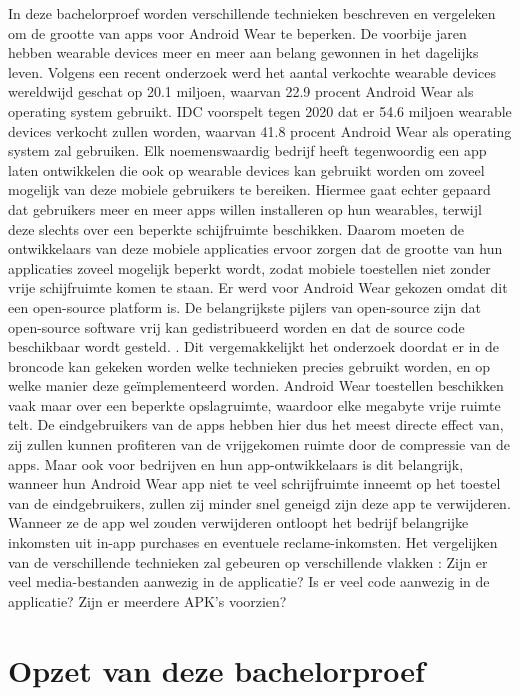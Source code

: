 In deze bachelorproef worden verschillende technieken beschreven en vergeleken om de grootte van apps voor Android Wear te beperken. De voorbije jaren hebben wearable devices meer en meer aan belang gewonnen in het dagelijks leven. Volgens een recent onderzoek werd het aantal verkochte wearable devices wereldwijd geschat op 20.1 miljoen, waarvan 22.9 procent Android Wear als operating system gebruikt. IDC voorspelt tegen 2020 dat er 54.6 miljoen wearable devices verkocht zullen worden, waarvan 41.8 procent Android Wear als operating system zal gebruiken. \autocite{IDC} Elk noemenswaardig bedrijf heeft tegenwoordig een app laten ontwikkelen die ook op wearable devices kan gebruikt worden om zoveel mogelijk van deze mobiele gebruikers te bereiken. Hiermee gaat echter gepaard dat gebruikers meer en meer apps willen installeren op hun wearables, terwijl deze slechts over een beperkte schijfruimte beschikken. Daarom moeten de ontwikkelaars van deze mobiele applicaties ervoor zorgen dat de grootte van hun applicaties zoveel mogelijk beperkt wordt, zodat mobiele toestellen niet zonder vrije schijfruimte komen te staan. Er werd voor Android Wear gekozen omdat dit een open-source platform is. De belangrijkste pijlers van open-source zijn dat open-source software vrij kan gedistribueerd worden en dat de source code beschikbaar wordt gesteld. \autocite{Open Source Initiative} . Dit vergemakkelijkt het onderzoek doordat er in de broncode kan gekeken worden welke technieken precies gebruikt worden, en op welke manier deze geïmplementeerd worden. Android Wear toestellen beschikken vaak maar over een beperkte opslagruimte, waardoor elke megabyte vrije ruimte telt. De eindgebruikers van de apps hebben hier dus het meest directe effect van, zij zullen kunnen profiteren van de vrijgekomen ruimte door de compressie van de apps. Maar ook voor bedrijven en hun app-ontwikkelaars is dit belangrijk, wanneer hun Android Wear app niet te veel schrijfruimte inneemt op het toestel van de eindgebruikers, zullen zij minder snel geneigd zijn deze app te verwijderen. Wanneer ze de app wel zouden verwijderen ontloopt het bedrijf belangrijke inkomsten uit in-app purchases en eventuele reclame-inkomsten. Het vergelijken van de verschillende technieken zal gebeuren op verschillende vlakken : Zijn er veel media-bestanden aanwezig in de applicatie? Is er veel code aanwezig in de applicatie? Zijn er meerdere APK's voorzien?

\section{Opzet van deze bachelorproef}
\label{sec:opzet-bachelorproef}

